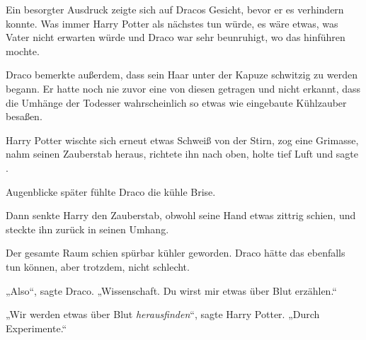 Ein besorgter Ausdruck zeigte sich auf Dracos Gesicht, bevor er es verhindern konnte. Was immer Harry Potter als nächstes tun würde, es wäre etwas, was Vater nicht erwarten würde und Draco war sehr beunruhigt, wo das hinführen mochte.

Draco bemerkte außerdem, dass sein Haar unter der Kapuze schwitzig zu werden begann. Er hatte noch nie zuvor eine von diesen getragen und nicht erkannt, dass die Umhänge der Todesser wahrscheinlich so etwas wie eingebaute Kühlzauber besaßen.

Harry Potter wischte sich erneut etwas Schweiß von der Stirn, zog eine Grimasse, nahm seinen Zauberstab heraus, richtete ihn nach oben, holte tief Luft und sagte .

Augenblicke später fühlte Draco die kühle Brise.


Dann senkte Harry den Zauberstab, obwohl seine Hand etwas zittrig schien, und steckte ihn zurück in seinen Umhang.

Der gesamte Raum schien spürbar kühler geworden. Draco hätte das ebenfalls tun können, aber trotzdem, nicht schlecht.

„Also“, sagte Draco.
„Wissenschaft. Du wirst mir etwas über Blut erzählen.“

„Wir werden etwas über Blut \emph{herausfinden}“, sagte Harry Potter.
„Durch Experimente.“

